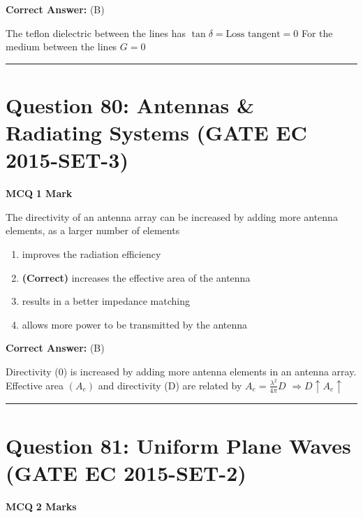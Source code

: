 \documentclass[11pt,a4paper]{article}
\begin{document}
\noindent \textbf{Correct Answer:} (B)

\begin{tcolorbox}[solbox, title=Detailed Solution -- Question 79]
The teflon dielectric between the lines has
$\tan \delta=\text{Loss tangent}=0$
 For the medium between the lines
$G=0$
\end{tcolorbox}

\vspace{1.5em}
\hrule
\vspace{1.5em}

\section*{Question 80: Antennas \& Radiating Systems (GATE EC 2015-SET-3)}
\noindent \textbf{\color{primary}MCQ} \hfill \textbf{\color{secondary}1 Mark}


\noindent The directivity of an antenna array can be increased by adding more antenna elements, as a larger number of elements


\begin{enumerate}[label=(\Alph*)]
    \item improves the radiation efficiency
    \item \textbf{(Correct)} increases the effective area of the antenna
    \item results in a better impedance matching
    \item allows more power to be transmitted by the antenna
\end{enumerate}

\noindent \textbf{Correct Answer:} (B)

\begin{tcolorbox}[solbox, title=Detailed Solution -- Question 80]
Directivity (0) is increased by adding more antenna elements in an antenna array. Effective area $(A_{e})$ and directivity (D) are related by 
$A_{e}=\frac{\lambda^{2}}{4 \pi} D$
$\Rightarrow D \uparrow A_{e} \uparrow$
\end{tcolorbox}

\vspace{1.5em}
\hrule
\vspace{1.5em}

\section*{Question 81: Uniform Plane Waves (GATE EC 2015-SET-2)}
\noindent \textbf{\color{primary}MCQ} \hfill \textbf{\color{secondary}2 Marks}
\end{document}
